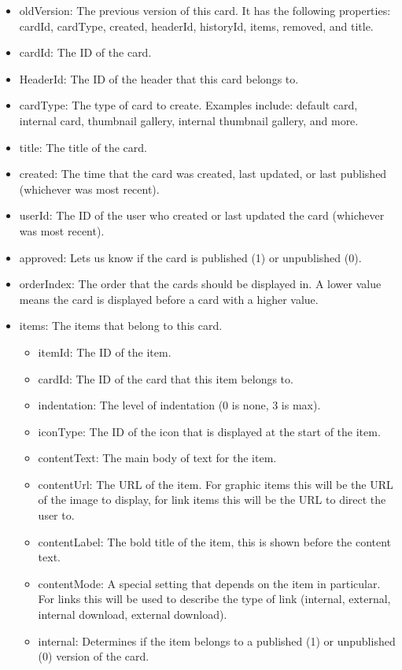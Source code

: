 \documentclass[onecolumn, draftclsnofoot,10pt, compsoc, usenames, dvipsnames]{IEEEtran}
\begin{document}
\begin{itemize}
\begin{itemize}
    \item oldVersion: The previous version of this card. It has the following properties: cardId, cardType, created, headerId, historyId, items, removed, and title.
    \item cardId: The ID of the card.
    \item HeaderId: The ID of the header that this card belongs to.
    \item cardType: The type of card to create. Examples include: default card, internal card, thumbnail gallery, internal thumbnail gallery, and more.
    \item title: The title of the card.
    \item created: The time that the card was created, last updated, or last published (whichever was most recent).
    \item userId: The ID of the user who created or last updated the card (whichever was most recent).
    \item approved: Lets us know if the card is published (1) or unpublished (0).
    \item orderIndex: The order that the cards should be displayed in. A lower value means the card is displayed before a card with a higher value.
    \item items: The items that belong to this card.
    \begin{itemize}
        \item itemId: The ID of the item.
        \item cardId: The ID of the card that this item belongs to.
        \item indentation: The level of indentation (0 is none, 3 is max).
        \item iconType: The ID of the icon that is displayed at the start of the item.
        \item contentText: The main body of text for the item.
        \item contentUrl: The URL of the item. For graphic items this will be the URL of the image to display, for link items this will be the URL to direct the user to.
        \item contentLabel: The bold title of the item, this is shown before the content text.
        \item contentMode: A special setting that depends on the item in particular. For links this will be used to describe the type of link (internal, external, internal download, external download).
        \item internal: Determines if the item belongs to a published (1) or unpublished (0) version of the card.

\end{itemize}
\end{itemize}
\end{itemize}
\end{document}

